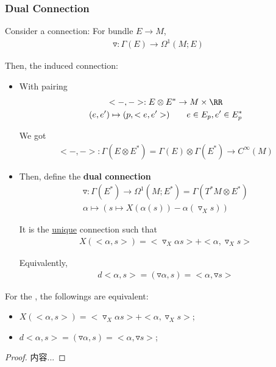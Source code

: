 \documentclass[Total.tex]{subfiles}
\begin{document}
			\subsubsection{Dual Connection}
				\begin{Def}
					Consider a connection: For bundle $E\rightarrow M$, 
					\begin{gather*}
						\triangledown:\Gamma(E)\rightarrow \Omega^1(M;E)
					\end{gather*}
					
					Then, the induced connection:
					\begin{itemize}
						\item  With pairing 
						\begin{gather*}
							<-,->:E\otimes E^*\rightarrow M\times \RR\\
							(e,e')\mapsto (p,<e,e'>)\qquad e\in E_p,e'\in E_p^*
						\end{gather*}
						
						We got
						\begin{gather*}
							<-,->:\Gamma(E\otimes E^*)=\Gamma(E)\otimes \Gamma(E^*)\rightarrow C^\infty(M)
						\end{gather*}
						
						\item Then, define the \textbf{dual connection}
						\begin{gather*}
							\triangledown:\Gamma(E^*)\rightarrow \Omega^1(M;E^*)=\Gamma(T^*M\otimes E^*)\\
							\alpha\mapsto (s\mapsto X(\alpha(s))-\alpha(\triangledown_X s))
						\end{gather*}
						
						It is the \underline{unique} connection such that
						\begin{gather*}
							X(<\alpha,s>)=<\triangledown_X \alpha s>+<\alpha,\triangledown_X s>
						\end{gather*}
						
						Equivalently,
						\begin{gather*}
							d<\alpha,s>=(\triangledown \alpha,s)=<\alpha,\triangledown s>
						\end{gather*}
					\end{itemize}
				\end{Def}
				
				\begin{proposition}
					For the , the followings are equivalent:
					\begin{itemize}
						\item $X(<\alpha,s>)=<\triangledown_X \alpha s>+<\alpha,\triangledown_X s>$;
						\item $d<\alpha,s>=(\triangledown \alpha,s)=<\alpha,\triangledown s>$;
					\end{itemize}
				\end{proposition}
				\begin{proof}
					内容...
				\end{proof}
				
\end{document}
